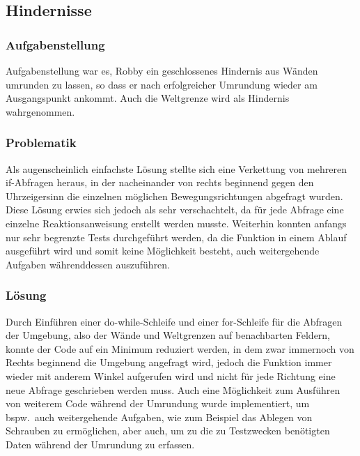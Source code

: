 \subsection{Hindernisse}

\subsubsection*{Aufgabenstellung}
Aufgabenstellung war es, Robby ein geschlossenes Hindernis aus Wänden umrunden zu lassen, so dass er nach erfolgreicher Umrundung wieder am Ausgangspunkt ankommt. Auch die Weltgrenze wird als Hindernis wahrgenommen.

\subsubsection*{Problematik}
Als augenscheinlich einfachste Lösung stellte sich eine Verkettung von mehreren if-Abfragen heraus, in der nacheinander von rechts beginnend gegen den Uhrzeigersinn die einzelnen möglichen Bewegungsrichtungen abgefragt wurden. Diese Lösung erwies sich jedoch als sehr verschachtelt, da für jede Abfrage eine einzelne Reaktionsanweisung erstellt werden musste.
Weiterhin konnten anfangs nur sehr begrenzte Tests durchgeführt werden, da die Funktion in einem Ablauf ausgeführt wird und somit keine Möglichkeit besteht, auch weitergehende Aufgaben währenddessen auszuführen.


\subsubsection*{Lösung}
Durch Einführen einer do-while-Schleife und einer for-Schleife für die Abfragen der Umgebung, also der Wände und Weltgrenzen auf benachbarten Feldern, konnte der Code auf ein Minimum reduziert werden, in dem  zwar immernoch von Rechts beginnend die Umgebung angefragt wird, jedoch die Funktion immer wieder mit anderem Winkel aufgerufen wird und nicht für jede Richtung eine neue Abfrage geschrieben werden muss.
Auch eine Möglichkeit zum Ausführen von weiterem Code während der Umrundung wurde implementiert, um bspw.\ auch weitergehende Aufgaben, wie zum Beispiel das Ablegen von Schrauben zu ermöglichen, aber auch, um zu die zu Testzwecken benötigten Daten während der Umrundung zu erfassen.

